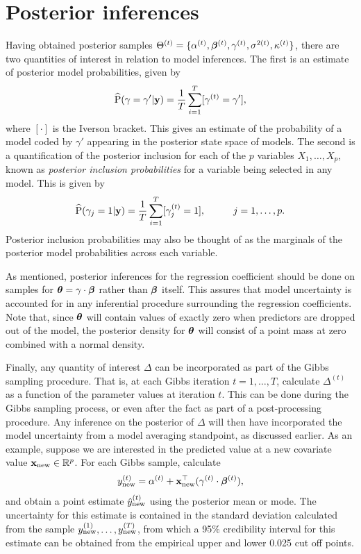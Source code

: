 \documentclass[a4paper,showframe,11pt]{report}
\begin{document}
\section{Posterior inferences}

Having obtained posterior samples $\Theta^{(t)}=\{\alpha^{(t)},{\bm\beta}^{(t)},\gamma^{(t)},\sigma^{2(t)},\kappa^{(t)} \}$, there are two quantities of interest in relation to model inferences. 
The first is an estimate of posterior model probabilities, given by
\begin{align}\label{eq:pmp-prop}
  \widehat {\operatorname{P}}(\gamma = \gamma' | {\mathbf y}) = \frac{1}{T}\sum_{i=1}^T [\gamma^{(t)} = \gamma'],
\end{align}
where $[\cdot]$ is the Iverson bracket.
This gives an estimate of the probability of a model coded by $\gamma'$ appearing in the posterior state space of models.
The second is a quantification of the posterior inclusion for each of the $p$ variables $X_1,\dots,X_p$, known as \emph{posterior inclusion probabilities} for a variable being selected in any model.
This is given by
\begin{align}\label{eq:pip-prop}
  \widehat {\operatorname{P}}(\gamma_j = 1 | {\mathbf y}) = \frac{1}{T}\sum_{i=1}^T [\gamma_j^{(t)} = 1], \hspace{1cm} j=1,\dots,p.
\end{align}
Posterior inclusion probabilities may also be thought of as the marginals of the posterior model probabilities across each variable.

As mentioned, posterior inferences for the regression coefficient should be done on samples for ${\bm\theta}=\gamma\cdot{\bm\beta}$ rather than ${\bm\beta}$ itself. 
This assures that model uncertainty is accounted for in any inferential procedure surrounding the regression coefficients.
Note that, since ${\bm\theta}$ will contain values of exactly zero when predictors are dropped out of the model, the posterior density for ${\bm\theta}$ will consist of a point mass at zero combined with a normal density.

Finally, any quantity of interest $\Delta$ can be incorporated as part of the Gibbs sampling procedure.
That is, at each Gibbs iteration $t=1,\dots,T$, calculate $\Delta^{(t)}$ as a function of the parameter values at iteration $t$.
This can be done during the Gibbs sampling process, or even after the fact as part of a post-processing procedure.
Any inference on the posterior of $\Delta$ will then have incorporated the model uncertainty from a model averaging standpoint, as discussed earlier.
As an example, suppose we are interested in the predicted value at a new covariate value ${\mathbf x}_\text{new} \in \mathbb{R}^p$.
For each Gibbs sample, calculate
\[
  y_{\text{new}}^{(t)} = \alpha^{(t)} + {\mathbf x}_\text{new}^\top (\gamma^{(t)}\cdot {\bm\beta}^{(t)}),
\]
and obtain a point estimate $\hat y_{\text{new}}^{(t)}$ using the posterior mean or mode.
The uncertainty for this estimate is contained in the standard deviation calculated from the sample $y_{\text{new}}^{(1)},\dots,y_{\text{new}}^{(T)}$, from which a 95\% credibility interval for this estimate can be obtained from the empirical upper and lower 0.025 cut off points.
\end{document}
